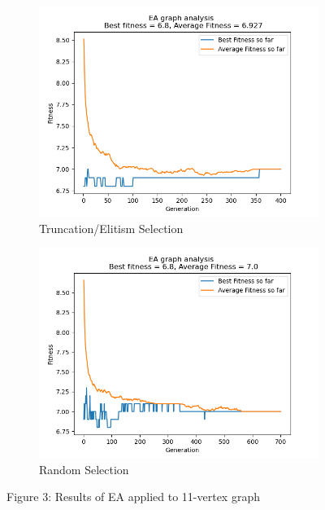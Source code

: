 \documentclass[conference,compsoc]{IEEEtran}
\begin{document}
\begin{figure}[htb]\ContinuedFloat
  \centering
  \begin{subfigure}{0.34\textwidth}
    \includegraphics[width=\linewidth]{../Results/_11_Truncation_Truncation_100_50_400.png}
    \caption{Truncation/Elitism Selection}
  \end{subfigure}
  \begin{subfigure}{0.34\textwidth}
    \includegraphics[width=\linewidth]{../Results/_11_Random_Truncation_100_50_700.png}
    \caption{Random Selection}
\end{subfigure}
\caption*{Figure 3: Results of EA applied to 11-vertex graph}
\label{fgigy}
\end{figure}
\end{document}
